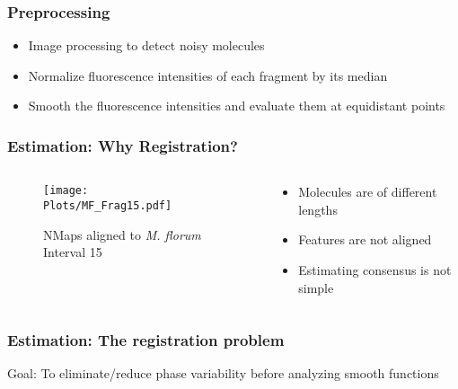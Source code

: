 \documentclass[10pt,dvipsnames,table]{beamer}
\begin{document}
\begin{frame}
\frametitle{Preprocessing}
\begin{itemize}
\item Image processing to detect noisy molecules
\vspace{0.5cm}
\item Normalize fluorescence intensities of each fragment by its median
\vspace{0.5cm}
\item Smooth the fluorescence intensities and evaluate them at equidistant points
\end{itemize}
\end{frame}

\begin{frame}
\frametitle{Estimation: Why Registration?}
\begin{columns}
\begin{column}{0.5\textwidth}
\begin{figure}[H]
\begin{center}
\texttt{[image: Plots/MF\_Frag15.pdf]}
\end{center}
\caption{NMaps aligned to {\emph{M. florum}} Interval 15}
\end{figure}
\end{column}
\begin{column}{0.5\textwidth}
\begin{itemize}
\item Molecules are of different lengths
\vspace{1cm}
\item Features are not aligned
\vspace{1cm}
\item Estimating consensus is not simple
\end{itemize}
\end{column}
\end{columns}
\end{frame}

\begin{frame}
\frametitle{Estimation: The registration problem}
\Large
Goal: To eliminate/reduce phase variability before analyzing smooth functions

\end{frame}
\end{document}
